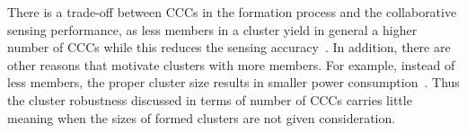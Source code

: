 \documentclass[10pt,journal,compsoc]{IEEEtran}
\theoremstyle{mytheoremstyle}
\theoremstyle{mytheoremstyle}
\theoremstyle{mytheoremstyle}
\newcommand{\ie}{i.e., }
\begin{document}
There is a trade-off between CCCs in the formation process and the collaborative sensing performance, as less members in a cluster yield in general a higher number of CCCs while this reduces the sensing accuracy~\cite{Consensus_based_clustering12}. 
In addition, there are other reasons that motivate clusters with more members.
For example, instead of less members, the proper cluster size results in smaller power consumption~\cite{clustering_globecom11, EnergyEfficientClusteringRouting_2015}.
%
Thus the cluster robustness discussed in terms of number of CCCs carries little meaning when the sizes of formed clusters are not given consideration.
\end{document}
